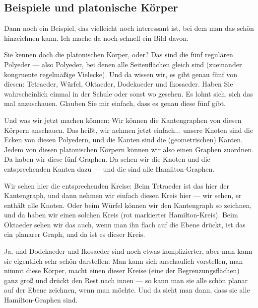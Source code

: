 \subsection{Beispiele und platonische Körper}

\begin{spoken-clean}[00:35:22 - 00:36:46]
Dann noch ein Beispiel, das vielleicht noch interessant ist, bei dem man das schön hinzeichnen kann. Ich mache da noch schnell ein Bild davon. 

Sie kennen doch die platonischen Körper, oder? Das sind die fünf regulären Polyeder --- also Polyeder, bei denen alle Seitenflächen gleich sind (zueinander kongruente regelmäßige Vielecke). Und da wissen wir, es gibt genau fünf von diesen: Tetraeder, Würfel, Oktaeder, Dodekaeder und Ikosaeder. Haben Sie wahrscheinlich einmal in der Schule oder sonst wo gesehen. Es lohnt sich, sich das mal anzuschauen. Glauben Sie mir einfach, dass es genau diese fünf gibt.

Und was wir jetzt machen können: Wir können die Kantengraphen von diesen Körpern anschauen. Das heißt, wir nehmen jetzt einfach... unsere Knoten sind die Ecken von diesen Polyedern, und die Kanten sind die (geometrischen) Kanten. Jedem von diesen platonischen Körpern können wir also einen Graphen zuordnen. Da haben wir diese fünf Graphen. Da sehen wir die Knoten und die entsprechenden Kanten dazu --- und die sind alle Hamilton-Graphen.
\end{spoken-clean}

\begin{spoken-clean}[00:36:46 - 00:38:07]
Wir sehen hier die entsprechenden Kreise: Beim Tetraeder ist das hier der Kantengraph, und dann nehmen wir einfach diesen Kreis hier --- wir sehen, er enthält alle Knoten. Oder beim Würfel können wir den Kantengraph so zeichnen, und da haben wir einen solchen Kreis (rot markierter Hamilton-Kreis). Beim Oktaeder sehen wir das auch, wenn man ihn flach auf die Ebene drückt, ist das ein planarer Graph, und da ist es dieser Kreis.

Ja, und Dodekaeder und Ikosaeder sind noch etwas komplizierter, aber man kann sie eigentlich sehr schön darstellen: Man kann sich anschaulich vorstellen, man nimmt diese Körper, macht einen dieser Kreise (eine der Begrenzungsflächen) ganz groß und drückt den Rest nach innen --- so kann man sie alle schön planar auf der Ebene zeichnen, wenn man möchte. Und da sieht man dann, dass sie alle Hamilton-Graphen sind.
\end{spoken-clean}

